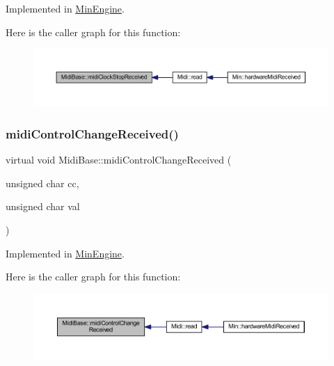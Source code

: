 Implemented in \hyperlink{class_min_engine_a08ac0328006e01f44ffbb3c78f4f504a}{Min\+Engine}.

Here is the caller graph for this function\+:
\nopagebreak
\begin{figure}[H]
\begin{center}
\leavevmode
\includegraphics[width=350pt]{class_midi_base_ab9a5c65ebffdfc31e118fef9e4dd04bb_icgraph}
\end{center}
\end{figure}
\mbox{\label{class_midi_base_a8364d72d525fd8a766a124ca3230a4c7}} 
\subsubsection{\texorpdfstring{midi\+Control\+Change\+Received()}{midiControlChangeReceived()}}
{\footnotesize\ttfamily virtual void Midi\+Base\+::midi\+Control\+Change\+Received (\begin{DoxyParamCaption}\item[{unsigned char}]{cc,  }\item[{unsigned char}]{val }\end{DoxyParamCaption})\hspace{0.3cm}{\ttfamily [pure virtual]}}



Implemented in \hyperlink{class_min_engine_ad7404def0db3926e77c8828cab13cca9}{Min\+Engine}.

Here is the caller graph for this function\+:
\nopagebreak
\begin{figure}[H]
\begin{center}
\leavevmode
\includegraphics[width=350pt]{class_midi_base_a8364d72d525fd8a766a124ca3230a4c7_icgraph}
\end{center}
\end{figure}
\mbox{\label{class_midi_base_aa26f04b4ead215bce201e480faf7c914}} 
